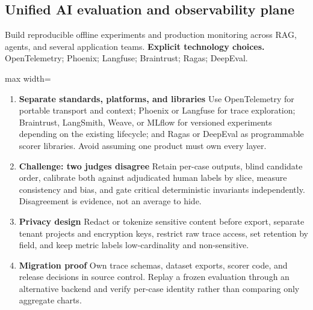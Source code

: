 \subsection{Unified AI evaluation and observability plane}
Build reproducible offline experiments and production monitoring across RAG, agents, and several application teams.
\textbf{Explicit technology choices.} OpenTelemetry; Phoenix; Langfuse; Braintrust; Ragas; DeepEval.
\begin{center}\begin{adjustbox}{max width=\linewidth}\end{adjustbox}\end{center}
\begin{enumerate}
\item \textbf{Separate standards, platforms, and libraries} Use OpenTelemetry for portable transport and context; Phoenix or Langfuse for trace exploration; Braintrust, LangSmith, Weave, or MLflow for versioned experiments depending on the existing lifecycle; and Ragas or DeepEval as programmable scorer libraries. Avoid assuming one product must own every layer.
\item \textbf{Challenge: two judges disagree} Retain per-case outputs, blind candidate order, calibrate both against adjudicated human labels by slice, measure consistency and bias, and gate critical deterministic invariants independently. Disagreement is evidence, not an average to hide.
\item \textbf{Privacy design} Redact or tokenize sensitive content before export, separate tenant projects and encryption keys, restrict raw trace access, set retention by field, and keep metric labels low-cardinality and non-sensitive.
\item \textbf{Migration proof} Own trace schemas, dataset exports, scorer code, and release decisions in source control. Replay a frozen evaluation through an alternative backend and verify per-case identity rather than comparing only aggregate charts.
\end{enumerate}
